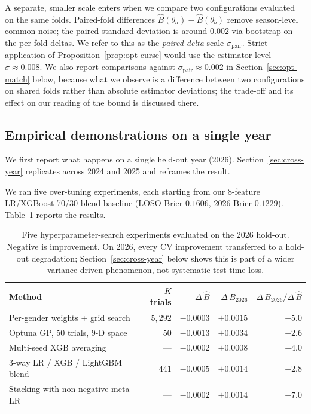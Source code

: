 \documentclass[11pt,a4paper]{article}
\theoremstyle{definition}
\begin{document}
A separate, smaller scale enters when we compare two configurations evaluated on the same folds. Paired-fold differences $\hat{B}(\theta_a) - \hat{B}(\theta_b)$ remove season-level common noise; the paired standard deviation is around $0.002$ via bootstrap on the per-fold deltas. We refer to this as the \emph{paired-delta} scale $\sigma_{\text{pair}}$. Strict application of Proposition~\ref{prop:opt-curse} would use the estimator-level $\sigma \approx 0.008$. We also report comparisons against $\sigma_{\text{pair}} \approx 0.002$ in Section~\ref{sec:opt-match} below, because what we observe is a difference between two configurations on shared folds rather than absolute estimator deviations; the trade-off and its effect on our reading of the bound is discussed there.

\subsection{Empirical demonstrations on a single year}

We first report what happens on a single held-out year (2026). Section~\ref{sec:cross-year} replicates across 2024 and 2025 and reframes the result.

We ran five over-tuning experiments, each starting from our 8-feature LR/XGBoost 70/30 blend baseline (LOSO Brier $0.1606$, 2026 Brier $0.1229$). Table~\ref{tab:opt-curse} reports the results.

\begin{table}[h]
\centering
\caption{Five hyperparameter-search experiments evaluated on the 2026 hold-out. Negative is improvement. On 2026, every CV improvement transferred to a hold-out degradation; Section~\ref{sec:cross-year} below shows this is part of a wider variance-driven phenomenon, not systematic test-time loss.}
\label{tab:opt-curse}
\small
\begin{tabular}{@{}lrrrr@{}}
\toprule
Method & $K$ trials & $\Delta\,\hat{B}$ & $\Delta\,B_{2026}$ & $\Delta\,B_{2026} / \Delta\,\hat{B}$ \\
\midrule
Per-gender weights + grid search & $5{,}292$ & $-0.0003$ & $+0.0015$ & $-5.0$ \\
Optuna GP, 50 trials, 9-D space   & $50$ & $-0.0013$ & $+0.0034$ & $-2.6$ \\
Multi-seed XGB averaging          & --- & $-0.0002$ & $+0.0008$ & $-4.0$ \\
3-way LR / XGB / LightGBM blend   & $441$ & $-0.0005$ & $+0.0014$ & $-2.8$ \\
Stacking with non-negative meta-LR & --- & $-0.0002$ & $+0.0014$ & $-7.0$ \\
\bottomrule
\end{tabular}
\end{table}
\end{document}
